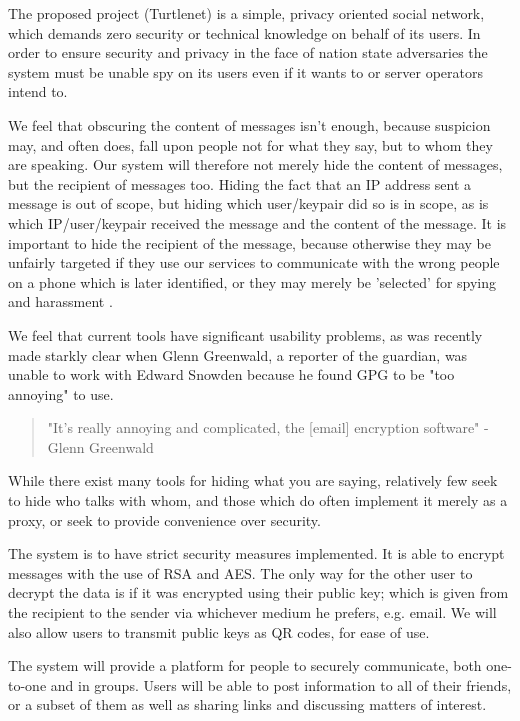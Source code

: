 The proposed project (Turtlenet) is a simple, privacy oriented social
network, which demands zero security or technical knowledge on behalf of its
users. In order to ensure security and privacy in the face of nation state
adversaries the system must be unable spy on its users even if it wants to or
server operators intend to.

We feel that obscuring the content of messages isn't enough, because suspicion
may, and often does, fall upon people not for what they say, but to whom they
are speaking\cite{trackingFriends}. Our system will therefore not merely hide
the content of messages, but the recipient of messages too. Hiding the fact that
an IP address sent a message is out of scope, but hiding which user/keypair did
so is in scope, as is which IP/user/keypair received the message and the content
of the message. It is important to hide the recipient of the message, because
otherwise they may be unfairly targeted\cite{droneCellTracking} if they use
our services to communicate with the wrong people on a phone which is later
identified, or they may merely be 'selected' for spying and harassment
\cite[3]{greenwaldAnnoying}.

We feel that current tools have significant usability problems, as was recently
made starkly clear when Glenn Greenwald, a reporter of the guardian, was unable
to work with Edward Snowden because he found GPG to be "too annoying" to use.

\begin{quote}
"It's really annoying and complicated, the [email] encryption software" - Glenn
Greenwald \cite{greenwaldAnnoying}
\end{quote}

While there exist many tools for hiding what you are saying, relatively few seek
to hide who talks with whom, and those which do often implement it merely as a
proxy, or seek to provide convenience over security.

The system is to have strict security measures implemented. It is able to
encrypt messages with the use of RSA and AES. The only way for the other user to
decrypt the data is if it was encrypted using their public key; which is given
from the recipient to the sender via whichever medium he prefers, e.g. email.
We will also allow users to transmit public keys as QR codes, for ease of use.

The system will provide a platform for people to securely communicate, both
one-to-one and in groups. Users will be able to post information to all of their
friends, or a subset of them as well as sharing links and discussing matters of
interest.

